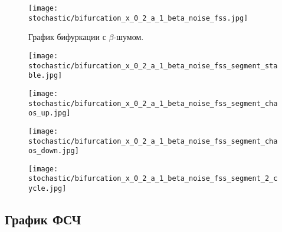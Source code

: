         \begin{figure}
            \centering
            \texttt{[image: stochastic/bifurcation\_x\_0\_2\_a\_1\_beta\_noise\_fss.jpg]}
        
            \captionsetup{justification=centering}
            \caption{График бифуркации с \(\beta\)-шумом.}
            \label{bifurcation_x_0_2_a_1_beta_chaos_fss}
        \end{figure}

        \begin{figure}
            \centering
            \texttt{[image: stochastic/bifurcation\_x\_0\_2\_a\_1\_beta\_noise\_fss\_segment\_stable.jpg]}
        
            \captionsetup{justification=centering}
            \caption{}
            \label{bifurcation_x_0_2_a_1_beta_chaos_fss_segment_stable}
        \end{figure}

        \begin{figure}
            \centering
            \texttt{[image: stochastic/bifurcation\_x\_0\_2\_a\_1\_beta\_noise\_fss\_segment\_chaos\_up.jpg]}
        
            \captionsetup{justification=centering}
            \caption{}
            \label{bifurcation_x_0_2_a_1_beta_chaos_fss_segment_chaos_up}
        \end{figure}

        \begin{figure}
            \centering
            \texttt{[image: stochastic/bifurcation\_x\_0\_2\_a\_1\_beta\_noise\_fss\_segment\_chaos\_down.jpg]}
        
            \captionsetup{justification=centering}
            \caption{}
            \label{bifurcation_x_0_2_a_1_beta_chaos_fss_segment_chaos_down}
        \end{figure}

        \begin{figure}
            \centering
            \texttt{[image: stochastic/bifurcation\_x\_0\_2\_a\_1\_beta\_noise\_fss\_segment\_2\_cycle.jpg]}
        
            \captionsetup{justification=centering}
            \caption{}
            \label{bifurcation_x_0_2_a_1_beta_chaos_fss_segment_2_cycle}
        \end{figure}


    \subsection{График ФСЧ}

        